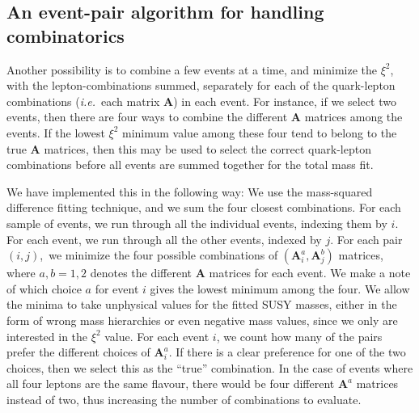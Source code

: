 \documentclass[twoside,english]{uiofysmaster}
\begin{document}
\subsection{An event-pair algorithm for handling combinatorics}
Another possibility is to combine a few events at a time, and minimize the $\xi^2$, with the lepton-combinations summed, separately for each of the quark-lepton combinations ({\it i.e.}\ each matrix $\mathbf{A}$) in each event. For instance, if we select two events, then there are four ways to combine the different $\mathbf{A}$ matrices among the events. If the lowest $\xi^2$ minimum value among these four tend to belong to the true $\mathbf{A}$ matrices, then this may be used to select the correct quark-lepton combinations before all events are summed together for the total mass fit. 

We have implemented this in the following way: We use the mass-squared difference fitting technique, and we sum the four closest combinations. For each sample of events, we run through all the individual events, indexing them by $i$. For each event, we run through all the other events, indexed by $j$. For each pair $(i,j)$,~we minimize the four possible combinations of $(\mathbf{A}_i^a, \mathbf{A}_j^b)$ matrices, where $a,b=1,2$ denotes the different $\mathbf{A}$ matrices for each event. We make a note of which choice $a$ for event $i$ gives the lowest minimum among the four. We allow the minima to take unphysical values for the fitted SUSY masses, either in the form of wrong mass hierarchies or even negative mass values, since we only are interested in the $\xi^2$ value. For each event $i$, we count how many of the pairs prefer the different choices of $\mathbf{A}_i^a$. If there is a clear preference for one of the two choices, then we select this as the ``true'' combination. In the case of events where all four leptons are the same flavour, there would be four different $\mathbf{A}^a$ matrices instead of two, thus increasing the number of combinations to evaluate.
\end{document}
